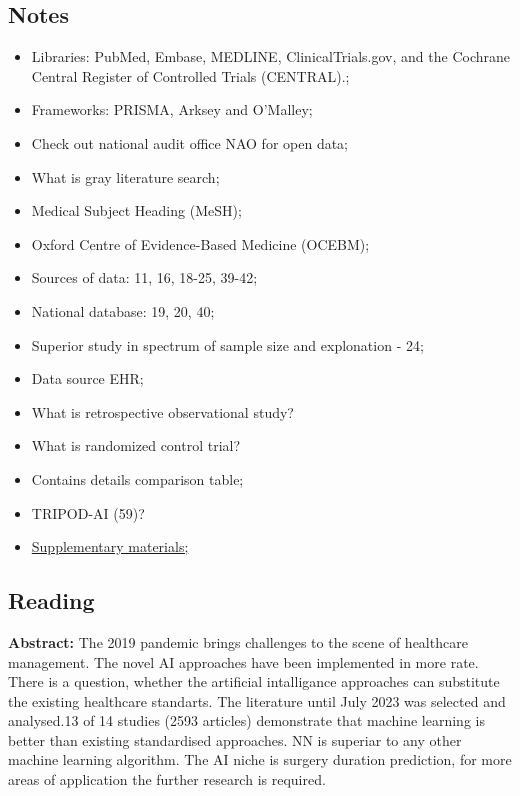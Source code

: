 \subsection{Notes}
    \begin{itemize}
        \item Libraries: PubMed, Embase, MEDLINE, ClinicalTrials.gov, and the Cochrane Central Register of Controlled Trials (CENTRAL).;
        \item Frameworks: PRISMA, Arksey and O’Malley;
        \item Check out national audit office NAO for open data; 
        \item What is gray literature search;
        \item Medical Subject Heading (MeSH);
        \item Oxford Centre of Evidence-Based Medicine (OCEBM);
        \item Sources of data: 11, 16, 18-25, 39-42;
        \item National database: 19, 20, 40;
        \item Superior study in spectrum of sample size and explonation - 24;
        \item Data source EHR;
        \item What is retrospective observational study?
        \item What is randomized control trial?
        \item Contains details comparison table;
        \item TRIPOD-AI (59)?
        \item \href{https://academic.oup.com/bjsopen/article/7/6/zrad113/7343203#supplementary-data}{Supplementary materials;}
    \end{itemize}


\subsection{Reading}

    \textbf{Abstract:}
    The 2019 pandemic brings challenges to the scene of healthcare management. The novel AI approaches have been implemented in more rate. There is a question, whether the artificial intalligance approaches can substitute the existing healthcare standarts. The literature until July 2023 was selected and analysed.13 of 14 studies (2593 articles) demonstrate that machine learning is better than existing standardised approaches. NN is superiar to any other machine learning algorithm. The AI niche is surgery duration prediction, for more areas of application the further research is required.


